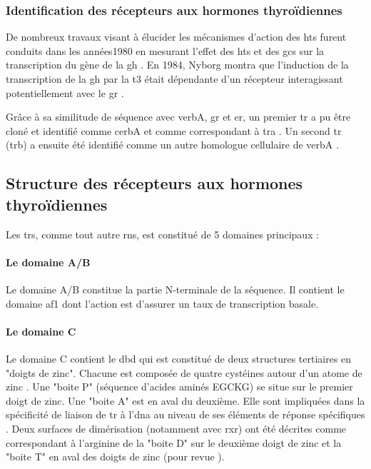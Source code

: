 \documentclass[../main.tex]{subfiles}
\begin{document}
\subsubsection{Identification des récepteurs aux hormones thyroïdiennes}
De nombreux travaux visant à élucider les mécanismes d'action des \glspl{ht} furent conduits dans les années1980 en mesurant l'effet des \glspl{ht} et des \glspl{gc} sur la transcription du gène de la \gls{gh} .
En 1984, Nyborg montra que l'induction de la transcription de la \gls{gh} par la \gls{t3} était dépendante d'un récepteur interagissant potentiellement avec le \gls{gr} \citep{Nyborg1984}.
\par
Grâce à sa similitude de séquence avec \gls{verbA}, \gls{gr} et \gls{er}, un premier \gls{tr} a pu être cloné et identifié comme \gls{cerbA} et comme correspondant à \gls{tra} \citep{Sap1986,Weinberger1986}.
Un second \gls{tr} (\gls{trb}) a ensuite été identifié comme un autre homologue cellulaire de \gls{verbA} \citep{Thompson1987}.


\subsection{Structure des récepteurs aux hormones thyroïdiennes}\label{subsubsec:struct-tr}
Les \glspl{tr}, comme tout autre \glspl{rn}, est constitué de 5 domaines principaux :

\paragraph{Le domaine A/B}
Le domaine A/B constitue la partie N-terminale de la séquence.
Il contient le domaine \gls{af1} dont l'action est d'assurer un taux de transcription basale.

\paragraph{Le domaine C}
Le domaine C contient le \gls{dbd} qui est constitué de deux structures tertiaires en "doigts de zinc".
Chacune est composée de quatre cystéines autour d'un atome de zinc \citep{Evans1988}.
Une "boite P" (séquence d'acides aminés EGCKG) se situe sur le premier doigt de zinc.
Une "boite A" est en aval du deuxième.
Elle sont impliquées dans la spécificité de liaison de \gls{tr} à l'\gls{dna} au niveau de ses éléments de réponse spécifiques \citep{Nelson1993}.
Deux surfaces de dimérisation (notamment avec \gls{rxr}) ont été décrites comme correspondant à l’arginine de la "boite D" sur le deuxième doigt de zinc et la "boite T" en aval des doigts de zinc (pour revue \citealp{Bain2007}).
\end{document}
